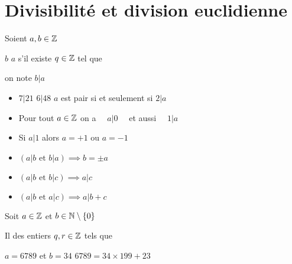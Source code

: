 \section{Divisibilité et division euclidienne}


\begin{frame}

Soient $a,b \in \mathbb{Z}$
\begin{mydefinition}
$b$  $a$ s'il existe $q \in \mathbb{Z}$ tel que 

\pause
\smallskip

\centerline{on note $b | a$}
\end{mydefinition}

\pause

\begin{exemple}
\begin{itemize}
  \item $7 | 21$ \pause\qquad $6 | 48$  \pause\qquad  $a$ est pair si et seulement si $2|a$
\pause
  \item Pour tout $a \in \mathbb{Z}$ on a \ \ $a | 0$ \ \   \pause et aussi \ \  $1|a$
\pause
  \item Si $a|1$ alors $a=+1$ ou $a=-1$
\pause
  \item $(a|b \text{ et } b|a) \implies b= \pm a$
\pause
  \item $(a|b \text{ et } b|c) \implies a | c$
\pause
  \item $(a|b \text{ et } a|c) \implies a | b+c$
\end{itemize}
\end{exemple}
\end{frame}

\begin{frame}
Soit $a\in \mathbb{Z}$ et $b\in \mathbb{N}\setminus \{0\}$
\begin{theoreme}
Il  des entiers $q,r \in \mathbb{Z}$  tels que
\end{theoreme}

\pause

\begin{exemple}
$a=6789$ et $b=34$ \qquad $6789= 34 \times 199 + 23$
\pause
{}

\end{exemple}
\end{frame}


